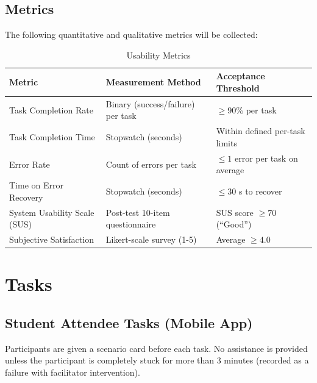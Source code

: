 \documentclass[12pt, titlepage]{article}
\begin{document}
\subsection{Metrics}


The following quantitative and qualitative metrics will be collected:


\begin{table}[H]
\centering
\caption{Usability Metrics}
\begin{tabularx}{\textwidth}{p{4cm}p{4cm}X}
\toprule
\textbf{Metric} & \textbf{Measurement Method} & \textbf{Acceptance Threshold} \\
\midrule
Task Completion Rate & Binary (success/failure) per task & $\geq 90\%$ per task \\
Task Completion Time & Stopwatch (seconds) & Within defined per-task limits \\
Error Rate & Count of errors per task & $\leq 1$ error per task on average \\
Time on Error Recovery & Stopwatch (seconds) & $\leq 30$ s to recover \\
System Usability Scale (SUS) & Post-test 10-item questionnaire & SUS score $\geq 70$ (``Good'') \\
Subjective Satisfaction & Likert-scale survey (1-5) & Average $\geq 4.0$ \\
\bottomrule
\end{tabularx}
\end{table}


\section{Tasks}


\subsection{Student Attendee Tasks (Mobile App)}


Participants are given a scenario card before each task. No assistance is provided unless the participant is completely stuck for more than 3 minutes (recorded as a failure with facilitator intervention).
\end{document}
